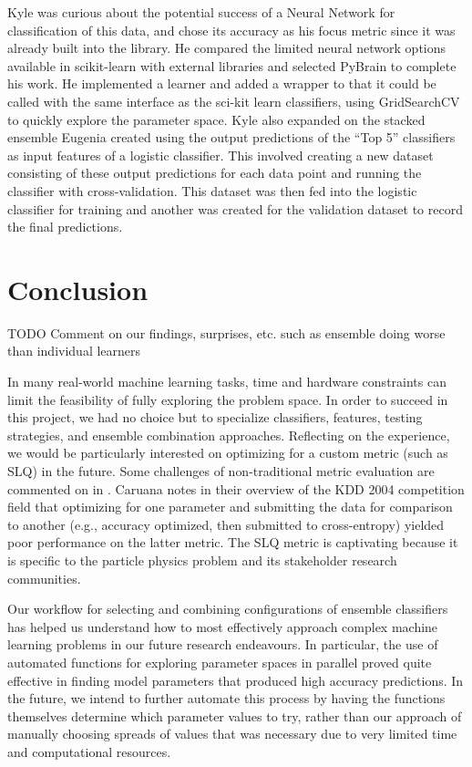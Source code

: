\documentclass{article}
\begin{document}
Kyle was curious about the potential success of a Neural Network for classification of this data, and chose its accuracy as his focus metric since it was already built into the library. 
He compared the limited neural network options available in scikit-learn with external libraries and selected PyBrain to complete his work.
He implemented a learner and added a wrapper to that it could be called with the same interface as the sci-kit learn classifiers, using GridSearchCV to quickly explore the parameter space.
Kyle also expanded on the stacked ensemble Eugenia created using the output predictions of the ``Top 5'' classifiers as input features of a logistic classifier.
This involved creating a new dataset consisting of these output predictions for each data point and running the classifier with cross-validation.
This dataset was then fed into the logistic classifier for training and another was created for the validation dataset to record the final predictions.



\section{Conclusion}

TODO Comment on our findings, surprises, etc.
such as ensemble doing worse than individual learners

In many real-world machine learning tasks, time and hardware constraints can limit the feasibility of fully exploring the problem space.
In order to succeed in this project, we had no choice but to specialize classifiers, features, testing strategies, and ensemble combination approaches.
Reflecting on the experience, we would be particularly interested on optimizing for a custom metric (such as SLQ) in the future.
Some challenges of non-traditional metric evaluation are commented on in \cite{vogel2004anti}.
Caruana notes in their overview of the KDD 2004 competition field \cite{caruana2004kdd} that optimizing for one parameter and submitting the data for comparison to another (e.g., accuracy optimized, then submitted to cross-entropy) yielded poor performance on the latter metric. 
The SLQ metric is captivating because it is specific to the particle physics problem and its stakeholder research communities. 

Our workflow for selecting and combining configurations of ensemble classifiers has helped us understand how to most effectively approach complex machine learning problems in our future research endeavours.
In particular, the use of automated functions for exploring parameter spaces in parallel proved quite effective in finding model parameters that produced high accuracy predictions.
In the future, we intend to further automate this process by having the functions themselves determine which parameter values to try, rather than our approach of manually choosing spreads of values that was necessary due to very limited time and computational resources.




\end{document}
